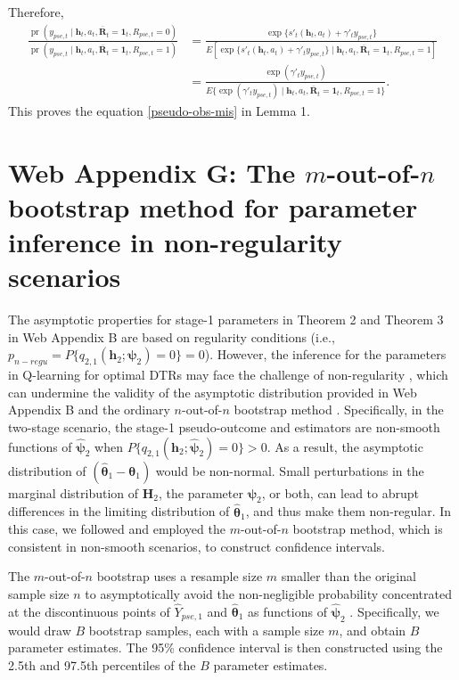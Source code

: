 \documentclass[12pt]{article}
\DeclareMathOperator{\pr}{pr}
\begin{document}
Therefore, 
\begin{align*}
    \frac{\pr(y_{pse,t}\mid \bm{h}_t,a_t,\overline{\bm{R}}_t = \bm{1}_t,R_{pse,t}=0)}{\pr(y_{pse,t}\mid \bm{h}_t,a_t,\overline{\bm{R}}_t = \bm{1}_t,R_{pse,t}=1)}&= \frac{\exp\{s'_t(\bm{h}_t,a_t)+\gamma'_t y_{pse,t}\}}{E[\exp\{s'_t(\bm{h}_t,a_t)+\gamma'_t y_{pse,t}\} \mid \bm{h}_t,a_t,\overline{\bm{R}}_t = \bm{1}_t, R_{pse,t}=1]}\\
    &= \frac{\exp(\gamma'_t y_{pse,t})}{E\{\exp(\gamma'_t y_{pse,t}) \mid \bm{h}_t,a_t,\overline{\bm{R}}_t = \bm{1}_t, R_{pse,t}=1\}}.
\end{align*}
This proves the equation \eqref{pseudo-obs-mis} in Lemma 1.

\section{Web Appendix G: The $m$-out-of-$n$ bootstrap method for parameter inference in non-regularity scenarios }
The asymptotic properties for stage-1 parameters in Theorem 2 and Theorem 3 in Web Appendix B are based on regularity conditions (i.e., $p_{n-regu} = P\{q_{2,1}(\bm{h}_2;\bm{\psi}_2)=0\} = 0$). However, the inference for the parameters in Q-learning for optimal DTRs may face the challenge of non-regularity \citep{chakraborty2010inference},
which can undermine the validity of the asymptotic distribution provided in Web Appendix B and the ordinary $n$-out-of-$n$ bootstrap method \citep{andrews2000inconsistency}. 
Specifically,  in the two-stage scenario, the stage-1 pseudo-outcome and estimators are  non-smooth functions of $\widehat{\bm{\psi}}_2$ when $P\{q_{2,1}(\bm{h}_2;\widehat{\bm{\psi}}_2)=0\} > 0$. As a result, the asymptotic distribution of $(\widehat{\bm{\theta}}_1 - \bm{\theta}_1)$ would be non-normal. Small perturbations in the marginal distribution of $\bm{H}_2$, the parameter $\bm{\psi}_2$, or both, can lead to abrupt differences in the limiting distribution of $\widehat{\bm{\theta}}_1$, and thus make them non-regular. 
In this case, we  followed \cite{chakraborty2013inference} and employed the $m$-out-of-$n$ bootstrap method, which is consistent in non-smooth scenarios,  to construct confidence intervals.

The $m$-out-of-$n$ bootstrap uses a resample size $m$ smaller than the original sample size $n$ to asymptotically avoid the non-negligible probability concentrated at the discontinuous points of $\widehat{Y}_{pse,1}$ and $\widehat{\bm{\theta}}_1$ as functions of $\widehat{\bm{\psi}}_2$ \citep{xu2015regularized}. Specifically, we would draw $B$  bootstrap samples, each with a sample size $m$, and obtain $B$ parameter estimates. The 95\% confidence interval is then constructed using the 2.5th and 97.5th percentiles of the $B$ parameter estimates. 
\end{document}

